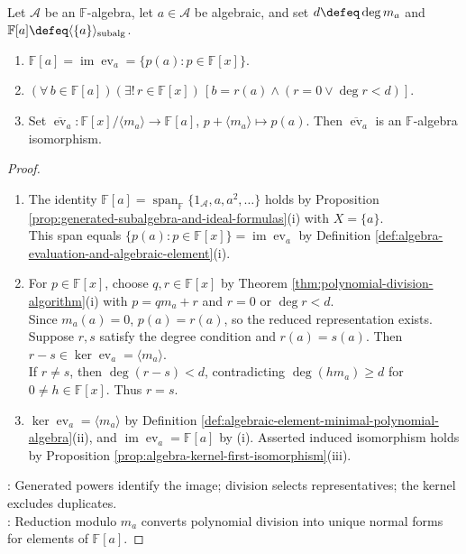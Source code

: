 \begin{proposition} \label{prop:generated-algebra-by-one-algebraic-element} \\
Let $\mathcal{A}$ be an $\mathbb{F}$-algebra, let $a\in\mathcal{A}$ be algebraic, and set $d\defeq\deg m_a$ and $\mathbb{F}[a]\defeq\langle\{a\}\rangle_{\operatorname{subalg}}$.
\begin{enumerate}[label=(\roman*)]
\setlength{\itemsep}{0pt}
\item $\mathbb{F}[a]=\operatorname{im}\operatorname{ev}_a=\{p(a):p\in\mathbb{F}[x]\}$.
\item $(\forall\,b\in\mathbb{F}[a])(\exists!\,r\in\mathbb{F}[x])\,[b=r(a)\land(r=0\lor\deg r<d)]$.
\item Set $\overline{\operatorname{ev}}_a:\mathbb{F}[x]/\langle m_a\rangle\to\mathbb{F}[a]$, $p+\langle m_a\rangle\mapsto p(a)$. Then $\overline{\operatorname{ev}}_a$ is an $\mathbb{F}$-algebra isomorphism.
\end{enumerate}
\begin{proof}
\begin{enumerate}[label=(\roman*)]
\setlength{\itemsep}{0pt}
\item[$(i)$] The identity $\mathbb{F}[a]=\operatorname{span}_{\mathbb{F}}\{1_{\mathcal{A}},a,a^2,\ldots\}$ holds by Proposition \ref{prop:generated-subalgebra-and-ideal-formulas}(i) with $X=\{a\}$.\\
This span equals $\{p(a):p\in\mathbb{F}[x]\}=\operatorname{im}\operatorname{ev}_a$ by Definition \ref{def:algebra-evaluation-and-algebraic-element}(i).
\item[$(ii)$] For $p\in\mathbb{F}[x]$, choose $q,r\in\mathbb{F}[x]$ by Theorem \ref{thm:polynomial-division-algorithm}(i) with $p=qm_a+r$ and $r=0$ or $\deg r<d$.\\
Since $m_a(a)=0$, $p(a)=r(a)$, so the reduced representation exists.\\
Suppose $r,s$ satisfy the degree condition and $r(a)=s(a)$. Then $r-s\in\ker\operatorname{ev}_a=\langle m_a\rangle$.\\
If $r\neq s$, then $\deg(r-s)<d$, contradicting $\deg(hm_a)\geq d$ for $0\neq h\in\mathbb{F}[x]$. Thus $r=s$.
\item[$(iii)$] $\ker\operatorname{ev}_a=\langle m_a\rangle$ by Definition \ref{def:algebraic-element-minimal-polynomial-algebra}(ii), and $\operatorname{im}\operatorname{ev}_a=\mathbb{F}[a]$ by (i). Asserted induced isomorphism holds by Proposition \ref{prop:algebra-kernel-first-isomorphism}(iii).
\end{enumerate}
: Generated powers identify the image; division selects representatives; the kernel excludes duplicates.\\
: Reduction modulo $m_a$ converts polynomial division into unique normal forms for elements of $\mathbb{F}[a]$.
\end{proof}
\end{proposition}

